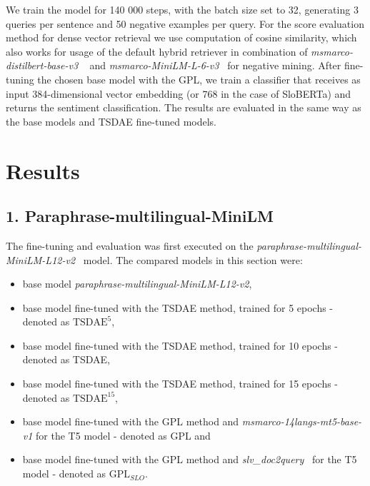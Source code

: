 \documentclass[fleqn,moreauthors,10pt]{ds_report}
\begin{document}
We train the model for 140 000 steps, with the batch size set to 32, generating 3 queries per sentence and 50 negative examples per query. For the score evaluation method for dense vector retrieval we use computation of cosine similarity, which also works for usage of the default hybrid retriever in combination of {\it msmarco-distilbert-base-v3 }~\cite{msmarcodistil} and {\it msmarco-MiniLM-L-6-v3}~\cite{msmarcominilm} for negative mining. After fine-tuning the chosen base model with the GPL, we train a classifier that receives as input 384-dimensional vector embedding (or 768 in the case of SloBERTa) and returns the sentiment classification. The results are evaluated in the same way as the base models and TSDAE fine-tuned models.





\section*{Results}


\subsection*{\large{1. Paraphrase-multilingual-MiniLM}}

The fine-tuning and evaluation was first executed on the {\it paraphrase-multilingual-MiniLM-L12-v2}~\cite{reimers-2019-sentence-bert} model. The compared models in this section were:
\begin{itemize}
	\item base model {\it paraphrase-multilingual-MiniLM-L12-v2},
	\item base model fine-tuned with the TSDAE method, trained for 5 epochs - denoted as $\text{TSDAE}^{5}$,
	\item base model fine-tuned with the TSDAE method, trained for 10 epochs - denoted as TSDAE,
	\item base model fine-tuned with the TSDAE method, trained for 15 epochs - denoted as $\text{TSDAE}^{15}$,
	\item base model fine-tuned with the GPL method and {\it msmarco-14langs-mt5-base-v1} \cite{msmarco14langs} for the T5 model - denoted as GPL and
	\item base model fine-tuned with the GPL method and {\it slv\_doc2query}~\cite{boshko} for the T5 model - denoted as $\text{GPL}_{SLO}$.
\end{itemize}
\end{document}
